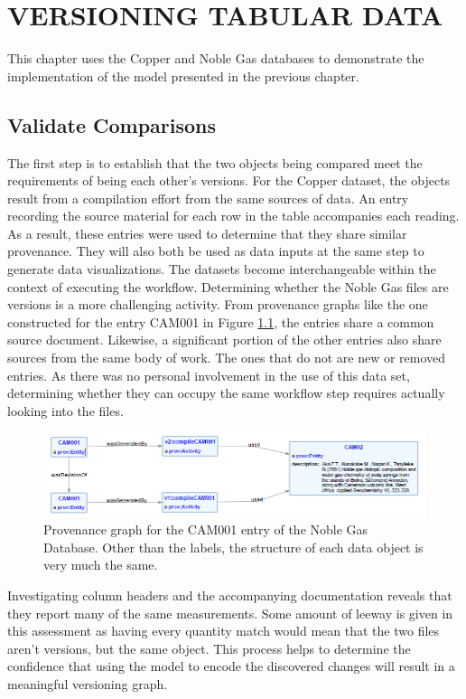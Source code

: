 
\chapter{VERSIONING TABULAR DATA}\label{ch:spreadsheet}

This chapter uses the Copper and Noble Gas databases to demonstrate the implementation of the model presented in the previous chapter.

\section{Validate Comparisons}

The first step is to establish that the two objects being compared meet the requirements of being each other's versions.
For the Copper dataset, the objects result from a compilation effort from the same sources of data.
An entry recording the source material for each row in the table accompanies each reading.
As a result, these entries were used to determine that they share similar provenance.
They will also both be used as data inputs at the same step to generate data visualizations.
The datasets become interchangeable within the context of executing the workflow.
Determining whether the Noble Gas files are versions is a more challenging activity.
From provenance graphs like the one constructed for the entry CAM001 in Figure \ref{CAM001ProvGraph}, the entries share a common source document.
Likewise, a significant portion of the other entries also share sources from the same body of work.
The ones that do not are new or removed entries.
As there was no personal involvement in the use of this data set, determining whether they can occupy the same workflow step requires actually looking into the files.
\begin{figure}
	\centering
	\includegraphics[scale=0.70]{figures/CAM001v1v2.png}
	\caption{Provenance graph for the CAM001 entry of the Noble Gas Database.  Other than the labels, the structure of each data object is very much the same.}
	\label{CAM001ProvGraph}
\end{figure}
Investigating column headers and the accompanying documentation reveals that they report many of the same measurements.
Some amount of leeway is given in this assessment as having every quantity match would mean that the two files aren't versions, but the same object.
This process helps to determine the confidence that using the model to encode the discovered changes will result in a meaningful versioning graph.


